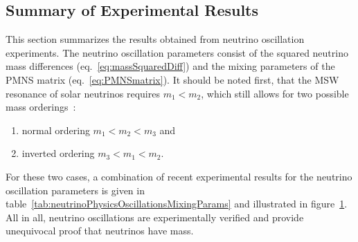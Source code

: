 \subsection{Summary of Experimental Results}
\label{sec:neutrinoPhysicsOscillationsMixingParams}
This section summarizes the results obtained from neutrino oscillation experiments. The neutrino oscillation parameters consist of the squared neutrino mass differences (eq.~\ref{eq:massSquaredDiff}) and the mixing parameters of the PMNS matrix (eq.~\ref{eq:PMNSmatrix}). It should be noted first, that the MSW resonance of solar neutrinos requires $m_1 < m_2$, which still allows for two possible mass orderings~\cite{zuber2011neutrino}:
\begin{enumerate}
    \item normal ordering $m_1 < m_2 < m_3$ and
    \item inverted ordering $m_3 < m_1 < m_2$.
\end{enumerate}
For these two cases, a combination of recent experimental results for the neutrino oscillation parameters is given in table~\ref{tab:neutrinoPhysicsOscillationsMixingParams} and illustrated in figure~\ref{fig:neutrinoPhysicsOscillationsMixingParams}. All in all, neutrino oscillations are experimentally verified and provide unequivocal proof that neutrinos have mass.
\FloatBarrier
\begin{figure}[t]
	\label{fig:neutrinoPhysicsOscillationsMixingParams}
\end{figure}


